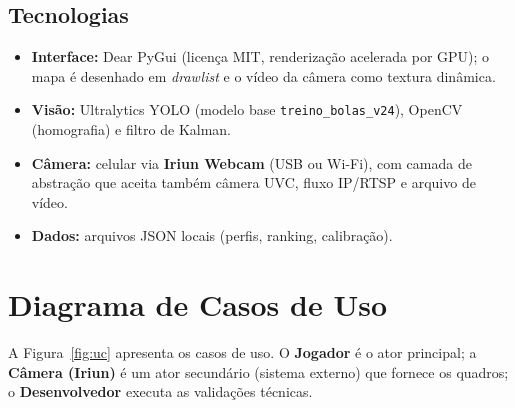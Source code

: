 \documentclass[a4paper,11pt]{article}
\begin{document}
\subsection{Tecnologias}
\begin{itemize}
  \item \textbf{Interface:} Dear PyGui (licença MIT, renderização acelerada por GPU); o mapa é desenhado em \textit{drawlist} e o vídeo da câmera como textura dinâmica.
  \item \textbf{Visão:} Ultralytics YOLO (modelo base \texttt{treino\_bolas\_v24}), OpenCV (homografia) e filtro de Kalman.
  \item \textbf{Câmera:} celular via \textbf{Iriun Webcam} (USB ou Wi-Fi), com camada de abstração que aceita também câmera UVC, fluxo IP/RTSP e arquivo de vídeo.
  \item \textbf{Dados:} arquivos JSON locais (perfis, ranking, calibração).
\end{itemize}

\section{Diagrama de Casos de Uso}
A Figura~\ref{fig:uc} apresenta os casos de uso. O \textbf{Jogador} é o ator principal; a \textbf{Câmera (Iriun)} é um ator secundário (sistema externo) que fornece os quadros; o \textbf{Desenvolvedor} executa as validações técnicas.
\end{document}
